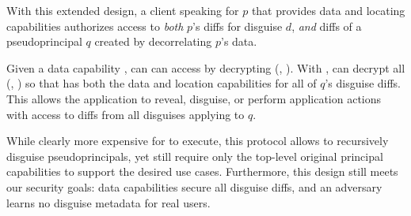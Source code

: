 With this extended design, a client speaking for $p$ that provides data and locating capabilities%
authorizes access to \emph{both} $p$'s diffs for disguise $d$, \emph{and}
diffs of a pseudoprincipal $q$ created by
decorrelating $p$'s data. 

Given a data capability , \sys can can access  by decrypting \enc(,
).
%
With , \sys can decrypt all \enc(, ) so that \sys has both the data and
location capabilities for all of $q$'s disguise diffs. This allows the application to reveal,
disguise, or perform application actions with access to diffs from all disguises applying to $q$.

While clearly more expensive for \sys to execute, this protocol allows \sys to recursively disguise
pseudoprincipals, yet still require only the top-level original principal capabilities to support the
desired use cases. Furthermore, this design still meets our security goals: data capabilities secure
all disguise diffs, and an adversary learns no disguise metadata for real users.

%
